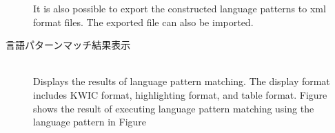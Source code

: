 \begin{description}

It is also possible to export the constructed language patterns to xml format files.
The exported file can also be imported.
\item[言語パターンマッチ結果表示]\mbox{}\\
Displays the results of language pattern matching. The display format includes KWIC format, highlighting format, and
table format. Figure  shows the result of executing language pattern matching using the language pattern in Figure 


\end{description}
